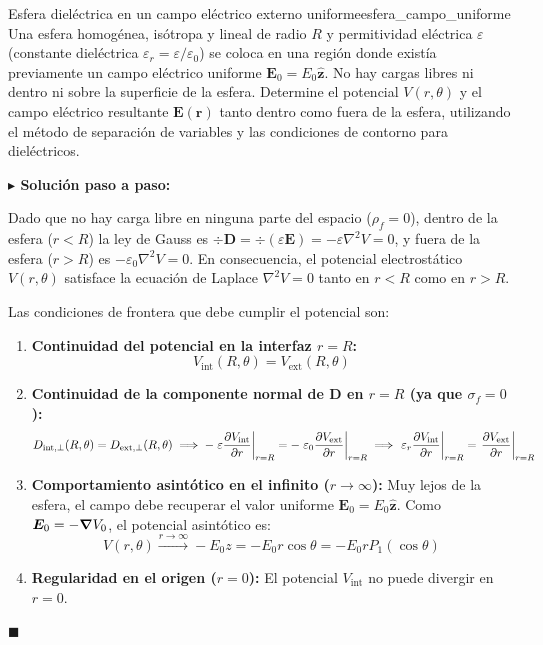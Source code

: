 \documentclass[11pt,a4paper]{book}
\newenvironment{solucion}{%
    \par\medskip\noindent\textbf{\color{blue!65!black}\Large $\blacktriangleright$ Solución paso a paso:}\par\medskip
}{%
    \hfill$\blacksquare$\par\bigskip
}
\newcommand{\zhat}{\hat{\bm{z}}}
\newcommand{\Evec}{\bm{E}}
\newcommand{\Dvec}{\bm{D}}
\begin{document}
\begin{ejercicio}{Esfera dieléctrica en un campo eléctrico externo uniforme}{esfera_campo_uniforme}
Una esfera homogénea, isótropa y lineal de radio $R$ y permitividad eléctrica $\varepsilon$ (constante dieléctrica $\varepsilon_r = \varepsilon/\varepsilon_0$) se coloca en una región donde existía previamente un campo eléctrico uniforme $\Evec_0 = E_0 \zhat$. No hay cargas libres ni dentro ni sobre la superficie de la esfera. Determine el potencial $V(r,\theta)$ y el campo eléctrico resultante $\Evec(\bm{r})$ tanto dentro como fuera de la esfera, utilizando el método de separación de variables y las condiciones de contorno para dieléctricos.
\end{ejercicio}

\begin{solucion}
Dado que no hay carga libre en ninguna parte del espacio ($\rho_f = 0$), dentro de la esfera ($r < R$) la ley de Gauss es $\div{\Dvec} = \div(\varepsilon\Evec) = -\varepsilon\nabla^2 V = 0$, y fuera de la esfera ($r > R$) es $-\varepsilon_0\nabla^2 V = 0$. En consecuencia, el potencial electrostático $V(r,\theta)$ satisface la ecuación de Laplace $\nabla^2 V = 0$ tanto en $r < R$ como en $r > R$.

Las condiciones de frontera que debe cumplir el potencial son:
\begin{enumerate}
    \item \textbf{Continuidad del potencial en la interfaz $r = R$:}
    \begin{equation}
        V_{\text{int}}(R,\theta) = V_{\text{ext}}(R,\theta)
    \end{equation}
    \item \textbf{Continuidad de la componente normal de $\Dvec$ en $r = R$ (ya que $\sigma_f = 0$):}
    \begin{equation}
        D_{\text{int},\perp}(R,\theta) = D_{\text{ext},\perp}(R,\theta) \implies -\left.\varepsilon \pdv{V_{\text{int}}}{r}\right|_{r=R} = -\left.\varepsilon_0 \pdv{V_{\text{ext}}}{r}\right|_{r=R} \implies \left.\varepsilon_r \pdv{V_{\text{int}}}{r}\right|_{r=R} = \left.\pdv{V_{\text{ext}}}{r}\right|_{r=R}
    \end{equation}
    \item \textbf{Comportamiento asintótico en el infinito ($r \to \infty$):}
    Muy lejos de la esfera, el campo debe recuperar el valor uniforme $\Evec_0 = E_0\zhat$. Como $\Evec_0 = -\grad V_0$, el potencial asintótico es:
    \begin{equation}
        V(r,\theta) \xrightarrow{r \to \infty} -E_0 z = -E_0 r \cos\theta = -E_0 r P_1(\cos\theta)
    \end{equation}
    \item \textbf{Regularidad en el origen ($r = 0$):}
    El potencial $V_{\text{int}}$ no puede divergir en $r=0$.
\end{enumerate}


\end{solucion}
\end{document}
